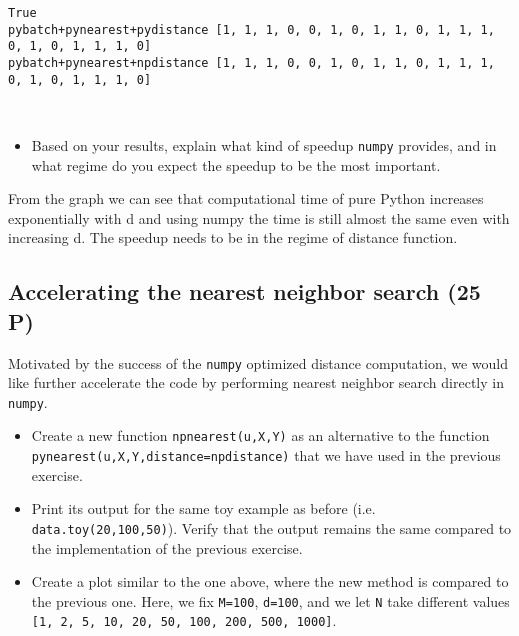 \documentclass[11pt]{article}
\providecommand{\tightlist}{%
      \setlength{\itemsep}{0pt}\setlength{\parskip}{0pt}}
\begin{document}
    \begin{Verbatim}[commandchars=\\\{\}]
True
pybatch+pynearest+pydistance [1, 1, 1, 0, 0, 1, 0, 1, 1, 0, 1, 1, 1, 0, 1, 0, 1, 1, 1, 0]
pybatch+pynearest+npdistance [1, 1, 1, 0, 0, 1, 0, 1, 1, 0, 1, 1, 1, 0, 1, 0, 1, 1, 1, 0]

    \end{Verbatim}

    \begin{center}
    \end{center}
    { \hspace*{\fill} \\}
    
    \begin{itemize}
\tightlist
\item
  Based on your results, explain what kind of speedup \texttt{numpy}
  provides, and in what regime do you expect the speedup to be the most
  important.
\end{itemize}
From the graph we can see that computational time of pure Python increases exponentially with d and using numpy the time is still almost the same even with increasing d.
The speedup needs to be in the regime of distance function.
    \subsection{Accelerating the nearest neighbor search (25
P)}\label{accelerating-the-nearest-neighbor-search-25-p}

Motivated by the success of the \texttt{numpy} optimized distance
computation, we would like further accelerate the code by performing
nearest neighbor search directly in \texttt{numpy}.

\begin{itemize}
\item
  Create a new function \texttt{npnearest(u,X,Y)} as an alternative to
  the function \texttt{pynearest(u,X,Y,distance=npdistance)} that we
  have used in the previous exercise.
\item
  Print its output for the same toy example as before (i.e.
  \texttt{data.toy(20,100,50)}). Verify that the output remains the same
  compared to the implementation of the previous exercise.
\item
  Create a plot similar to the one above, where the new method is
  compared to the previous one. Here, we fix \texttt{M=100},
  \texttt{d=100}, and we let \texttt{N} take different values
  \texttt{{[}1,\ 2,\ 5,\ 10,\ 20,\ 50,\ 100,\ 200,\ 500,\ 1000{]}}.
\end{itemize}
\end{document}
